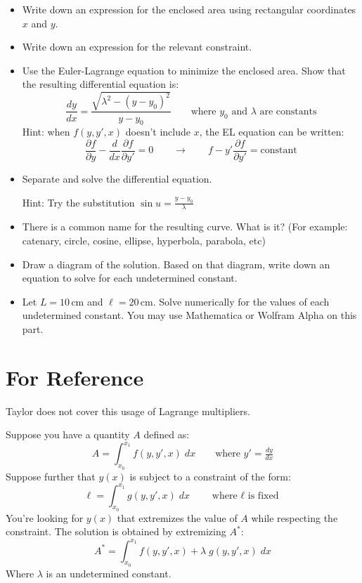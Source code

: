 \documentclass{article}
\begin{document}
\begin{itemize}
    \item Write down an expression for the enclosed area using rectangular coordinates $x$ and $y$.
    \item Write down an expression for the relevant constraint.
    \item Use the Euler-Lagrange equation to minimize the enclosed area. 
    Show that the resulting differential equation is:
    $$
    \frac{dy}{dx} = \frac{ \sqrt{ \lambda^2 - \left( y - y_0 \right)^2 } }{ y - y_0 }
    \quad\quad\text{where $y_0$ and $\lambda$ are constants}
    $$
    Hint: when $f(y, y', x)$ doesn't include $x$, the EL equation can be written: 
    $$
    \frac{\partial f}{\partial y} - \frac{d}{dx} \frac{\partial f}{\partial y'} = 0
    \quad\quad\rightarrow\quad\quad
    f - y' \frac{\partial f}{\partial y'} = \text{constant}
    $$
    \item Separate and solve the differential equation. 
    
    Hint: Try the substitution $\sin u = \tfrac{y - y_0}{\lambda}$
    \item There is a common name for the resulting curve. What is it? (For example: catenary, circle, cosine, ellipse, hyperbola, parabola, etc)
    \item Draw a diagram of the solution. Based on that diagram, write down an equation to solve for each undetermined constant.
    \item Let $L=10\,\text{cm}$ and $\ell=20\,\text{cm}$. Solve numerically for the values of each undetermined constant. You may use Mathematica or Wolfram Alpha on this part.
    
\end{itemize}

\newpage
\section*{For Reference}

Taylor does not cover this usage of Lagrange multipliers. 

Suppose you have a quantity $A$ defined as:
$$
A = \displaystyle\int_{x_0}^{x_1} f(y, y', x) \; dx
\quad\quad\text{where $y' = \tfrac{dy}{dx}$}
$$
Suppose further that $y(x)$ is subject to a constraint of the form:
$$
\ell = \displaystyle\int_{x_0}^{x_1} g(y, y', x) \; dx
\quad\quad\text{where $\ell$ is fixed}
$$
You're looking for $y(x)$ that extremizes the value of $A$ while respecting the constraint. The solution is obtained by extremizing $A^*$:
$$
A^* = \displaystyle\int_{x_0}^{x_1} f(y, y', x) + \lambda \; g(y, y', x) \; dx
$$
Where $\lambda$ is an undetermined constant.
\end{document}
